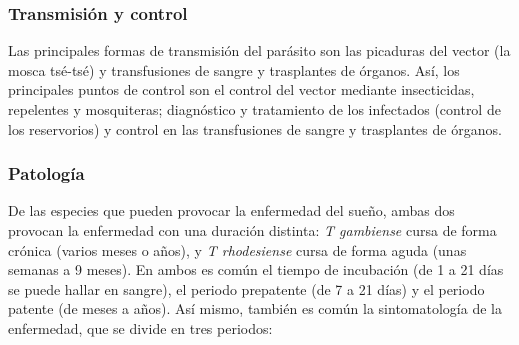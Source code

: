 \subsubsection{Transmisión y control}
Las principales formas de transmisión del parásito son las picaduras del vector (la mosca tsé-tsé) y transfusiones de sangre y trasplantes de órganos. Así, los principales puntos de control son el control del vector mediante insecticidas, repelentes y mosquiteras; diagnóstico y tratamiento de los infectados (control de los reservorios) y control en las transfusiones de sangre y trasplantes de órganos.
\subsubsection{Patología}
De las especies que pueden provocar la enfermedad del sueño, ambas dos provocan la enfermedad con una duración distinta: \textit{T gambiense} cursa de forma crónica (varios meses o años), y \textit{T rhodesiense} cursa de forma aguda (unas semanas a 9 meses). En ambos es común el tiempo de incubación (de 1 a 21 días se puede hallar en sangre), el periodo prepatente (de 7 a 21 días) y el periodo patente (de meses a años). Así mismo, también es común la sintomatología de la enfermedad, que se divide en tres periodos:
